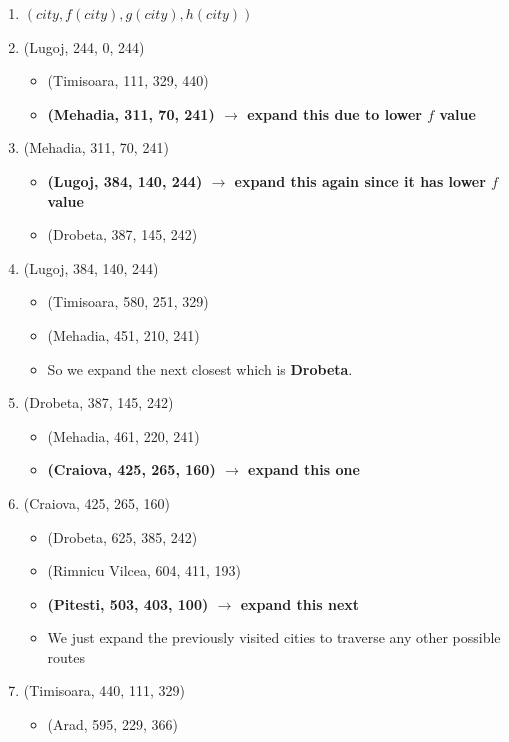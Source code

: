 \documentclass{article}
\begin{document}
\begin{enumerate}
   \item $(city, f(city), g(city), h(city))$
   \item (Lugoj, 244, 0, 244)
   \begin{itemize}
      \item (Timisoara, 111, 329, 440)
      \item \textbf{(Mehadia, 311, 70, 241) $\rightarrow$ expand this due to lower $f$ value}
   \end{itemize}
   \item (Mehadia, 311, 70, 241)
   \begin{itemize}
      \item \textbf{(Lugoj, 384, 140, 244) $\rightarrow$ expand this again since it has lower $f$ value}
      \item (Drobeta, 387, 145, 242)
   \end{itemize}
   \item (Lugoj, 384, 140, 244)
   \begin{itemize}
      \item (Timisoara, 580, 251, 329) 
      \item (Mehadia, 451, 210, 241) 
      \item So we expand the next closest which is \textbf{Drobeta}.
   \end{itemize}
   \item (Drobeta, 387, 145, 242)
   \begin{itemize}
      \item (Mehadia, 461, 220, 241)
      \item \textbf{(Craiova, 425, 265, 160) $\rightarrow$ expand this one}
   \end{itemize}
   \item (Craiova, 425, 265, 160)
   \begin{itemize}
      \item (Drobeta, 625, 385, 242)
      \item (Rimnicu Vilcea, 604, 411, 193)
      \item \textbf{(Pitesti, 503, 403, 100) $\rightarrow$ expand this next}
      \item We just expand the previously visited cities to traverse any other possible routes
   \end{itemize}
   \item (Timisoara, 440, 111, 329)
   \begin{itemize}
      \item (Arad, 595, 229, 366)

\end{itemize}
\end{enumerate}
\end{document}
